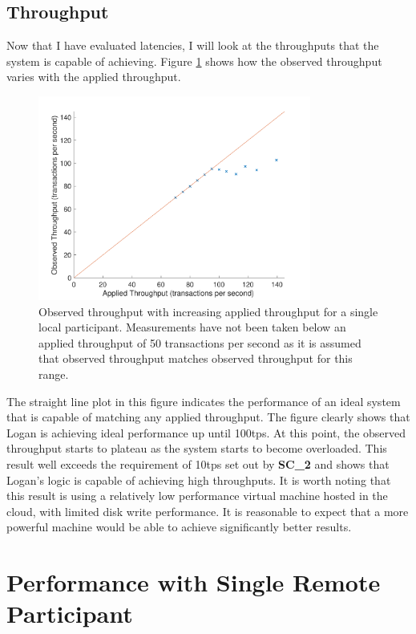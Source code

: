 \documentclass[12pt,a4paper,twoside,openright]{report}
\begin{document}
	\subsection{Throughput}
	Now that I have evaluated latencies, I will look at the throughputs that the system is capable of achieving.
	Figure \ref{fig:singlocal} shows how the observed throughput varies with the applied throughput.  
	\begin{figure}
		\centering
		\includegraphics[width=0.8\textwidth]{figs/appliedvsobservedlocal.pdf} 
		\caption{Observed throughput with increasing applied throughput for a single local participant. Measurements have not been taken below an applied throughput of 50 transactions per second as it is assumed that observed throughput matches observed throughput for this range.}
		\label{fig:singlocal}
	\end{figure}
	The straight line plot in this figure indicates the performance of an ideal system that is capable of matching any applied throughput.
	The figure clearly shows that Logan is achieving ideal performance up until 100tps.
	At this point, the observed throughput starts to plateau as the system starts to become overloaded. 
	This result well exceeds the requirement of 10tps set out by \textbf{SC\_2} and shows that Logan's logic is capable of achieving high throughputs.
	It is worth noting that this result is using a relatively low performance virtual machine hosted in the cloud, with limited disk write performance. 
	It is reasonable to expect that a more powerful machine would be able to achieve significantly better results.\\

	\section{Performance with Single Remote Participant}
\end{document}
